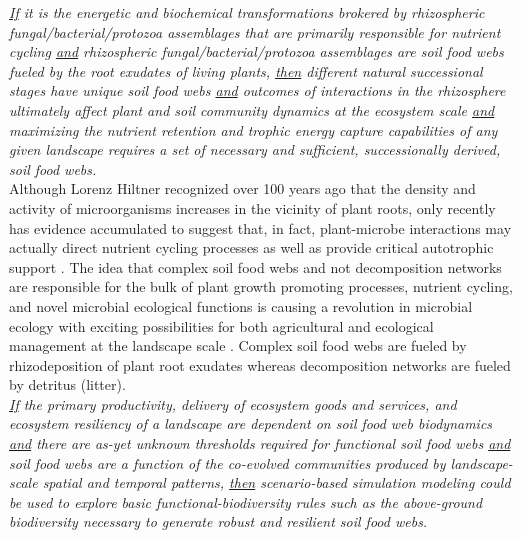\textit{\underline{If} it is the energetic and biochemical transformations brokered by rhizospheric fungal/bacterial/protozoa assemblages that are primarily responsible for nutrient cycling \underline{and} rhizospheric fungal/bacterial/protozoa assemblages are soil food webs fueled by the root exudates of living plants, \underline{then} different natural successional stages have unique soil food webs \underline{and} outcomes of interactions in the rhizosphere ultimately affect plant and soil community dynamics at the ecosystem scale \underline{and} maximizing the nutrient retention and trophic energy capture capabilities of any given landscape requires a set of necessary and sufficient, successionally derived, soil food webs.}\\

Although Lorenz Hiltner recognized over 100 years ago that the density and activity of microorganisms increases in the vicinity of plant roots, only recently has evidence accumulated to suggest that, in fact, plant-microbe interactions may actually direct nutrient cycling processes as well as provide critical autotrophic support \citep{ingham_interactions_1985, bais_role_2006}. The idea that complex soil food webs and not decomposition networks are responsible for the bulk of plant growth promoting processes, nutrient cycling, and novel microbial ecological functions is causing a revolution in microbial ecology with exciting possibilities for both agricultural and ecological management at the landscape scale \citep{prosser_role_2007, smith_plant_2009, pedraza_plant_2009, de_vries_soil_2013, hedlund_trophic_2004, holtkamp_soil_2008, minoshima_soil_2007, rygiewicz_soil_2010, wardle_how_1999}. Complex soil food webs are fueled by rhizodeposition of plant root exudates whereas decomposition networks are fueled by detritus (litter). \\

\textit{\underline{If} the primary productivity, delivery of ecosystem goods and services, and ecosystem resiliency of a landscape are dependent on soil food web biodynamics \underline{and} there are as-yet unknown thresholds required for functional soil food webs \underline{and} soil food webs are a function of the co-evolved communities produced by landscape-scale spatial and temporal patterns, \underline{then} scenario-based simulation modeling could be used to explore basic functional-biodiversity rules such as the above-ground biodiversity necessary to generate robust and resilient soil food webs.}\\

